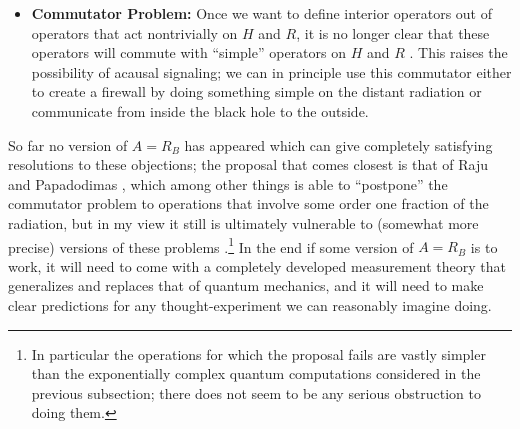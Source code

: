 \documentclass[12pt]{article}
\begin{document}
\begin{itemize}
\item \textbf{Commutator Problem:}  Once we want to define interior operators out of operators that act nontrivially on $H$ and $R$, it is no longer clear that these operators will commute with ``simple'' operators on $H$ and $R$ \cite{Almheiri:2013hfa}.  This raises the possibility of acausal signaling; we can in principle use this commutator either to create a firewall by doing something simple on the distant radiation or communicate from inside the black hole to the outside.  
\end{itemize}
So far no version of $A=R_B$ has appeared which can give completely satisfying resolutions to these objections; the proposal that comes closest is that of Raju and Papadodimas \cite{Papadodimas:2013wnh,Papadodimas:2013jku}, which among other things is able to ``postpone'' the commutator problem to operations that involve some order one fraction of the radiation, but in my view it still is ultimately vulnerable to (somewhat more precise) versions of these problems \cite{Harlow:2014yoa}.\footnote{In particular the operations for which the proposal fails are vastly simpler than the exponentially complex quantum computations considered in the previous subsection; there does not seem to be any serious obstruction to doing them.}  In the end if some version of $A=R_B$ is to work, it will need to come with a completely developed measurement theory that generalizes and replaces that of quantum mechanics, and it will need to make clear predictions for any thought-experiment we can reasonably imagine doing.     
\end{document}
